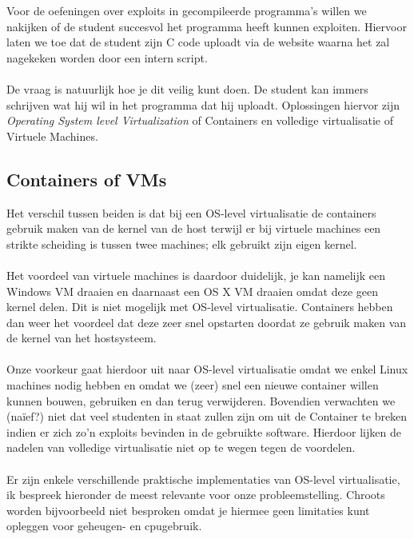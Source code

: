 Voor de oefeningen over exploits in gecompileerde programma's willen we nakijken of de student succesvol het programma heeft kunnen exploiten. Hiervoor laten we toe dat de student zijn C code uploadt via de website waarna het zal nagekeken worden door een intern script.\\
\\
De vraag is natuurlijk hoe je dit veilig kunt doen. De student kan immers schrijven wat hij wil in het programma dat hij uploadt. Oplossingen hiervor zijn \emph{Operating System level Virtualization} of Containers en volledige virtualisatie of Virtuele Machines.

\subsection{Containers of VMs}
Het verschil tussen beiden is dat bij een OS-level virtualisatie de containers gebruik maken van de kernel van de host terwijl er bij virtuele machines een strikte scheiding is tussen twee machines; elk gebruikt zijn eigen kernel.\\
\\
Het voordeel van virtuele machines is daardoor duidelijk, je kan namelijk een Windows VM draaien en daarnaast een OS X VM draaien omdat deze geen kernel delen. Dit is niet mogelijk met OS-level virtualisatie. Containers hebben dan weer het voordeel dat deze zeer snel opstarten doordat ze gebruik maken van de kernel van het hostsysteem.\\
\\
Onze voorkeur gaat hierdoor uit naar OS-level virtualisatie omdat we enkel Linux machines nodig hebben en omdat we (zeer) snel een nieuwe container willen kunnen bouwen, gebruiken en dan terug verwijderen. Bovendien verwachten we (na\"ief?) niet dat veel studenten in staat zullen zijn om uit de Container te breken indien er zich zo'n exploits bevinden in de gebruikte software. Hierdoor lijken de nadelen van volledige virtualisatie niet op te wegen tegen de voordelen.\\
\\
Er zijn enkele verschillende praktische implementaties van OS-level virtualisatie, ik bespreek hieronder de meest relevante voor onze probleemstelling. Chroots worden bijvoorbeeld niet besproken omdat je hiermee geen limitaties kunt opleggen voor geheugen- en cpugebruik.
